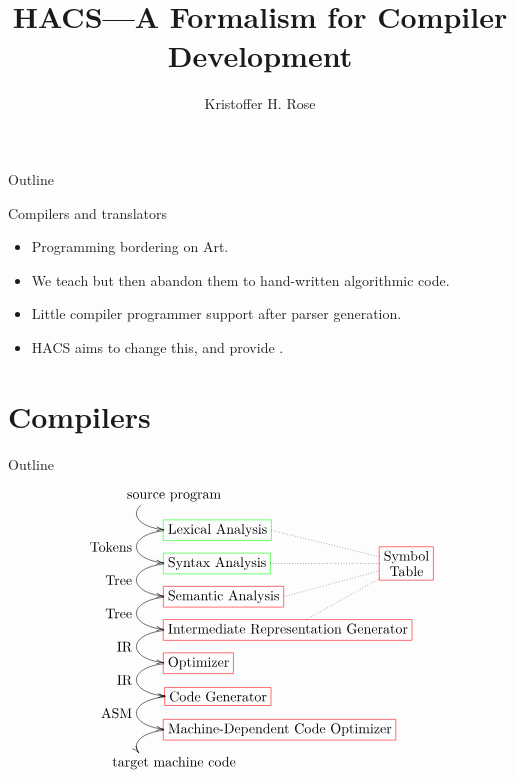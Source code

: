 \documentclass[pdftex,aspectratio=169,14pt]{beamer}
\title{HACS---A Formalism for Compiler Development}
\author[Kris Rose]{Kristoffer H. Rose}
\begin{document}
\frame{\titlepage}

\begin{frame}{Outline}
  \tableofcontents
\end{frame}


\begin{frame}{Compilers and translators}
  \begin{itemize}

  \item Programming  \pause bordering on \alert{Art}.\pause

  \item We teach  \pause but then abandon them
    to \alert{hand-written algorithmic code}.\pause

  \item Little compiler programmer support after parser generation.\pause

  \item HACS aims to change this, and provide .

  \end{itemize}
\end{frame}


\section{Compilers}
\begin{frame}{Outline}
  \tableofcontents[current]
\end{frame}

\begin{frame}[fragile]{}
  \vspace*{-3ex}
  \begin{displaymath}
    \xygraph{!{;(.66,0):}
      []*+\txt{source program}
      :@(l,l)  [d]*+[r][F:green]\txt{Lexical Analysis}="L"
      :@(l,l) _{\txt{Tokens}} [d]*+[r][F:green]\txt{Syntax Analysis}="P"
      :@(l,l) _{\txt{Tree}}  [d]*+[r][F:red]\txt{Semantic Analysis}="A"
      :@(l,l) _{\txt{Tree}} [d]*+[r][F:red]\txt{Intermediate Representation Generator}="IR"
                              ( "P"[r(7)]*+[F:red]\txt{Symbol\\Table}
                                ( -@. "L"!{+R} , -@. "P"!{+R} , -@. "A"!{+R} , -@. "IR"!{!C} ) )
      :@(l,l) _{\txt{IR}} [d]*+[r][F:red]\txt{Optimizer}
      :@(l,l) _{\txt{IR}} [d]*+[r][F:red]\txt{Code Generator}
      :@(l,l) _{\txt{ASM}} [d]*+[r][F:red]\txt{Machine-Dependent Code Optimizer}
      :@(l,l)  [d]*+\txt{target machine code}
    }
  \end{displaymath}
\end{frame}
\end{document}
